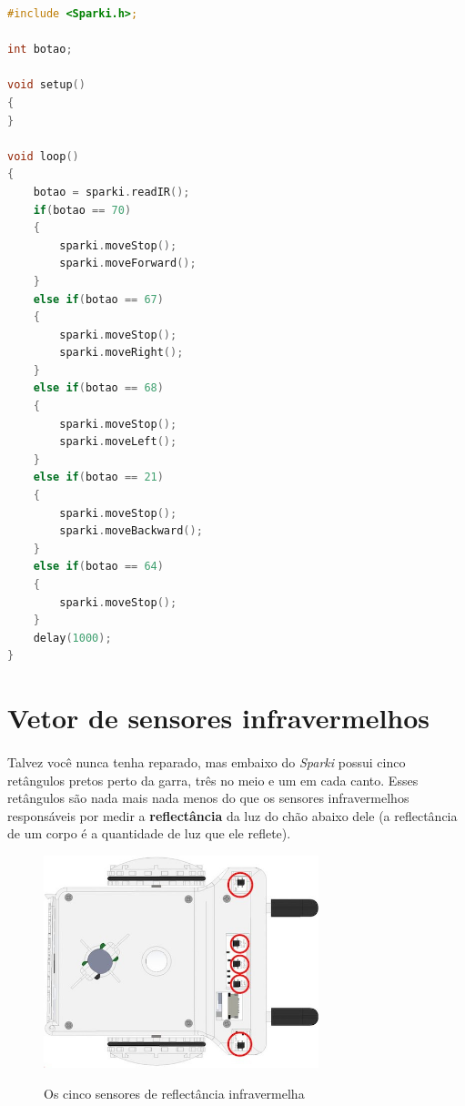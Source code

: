     \begin{lstlisting}[language=C]
#include <Sparki.h>;

int botao;

void setup()
{
}

void loop()
{
    botao = sparki.readIR();
    if(botao == 70)
    {
        sparki.moveStop();
        sparki.moveForward();
    }
    else if(botao == 67)
    {
        sparki.moveStop();
        sparki.moveRight();
    }
    else if(botao == 68)
    {
        sparki.moveStop();
        sparki.moveLeft();
    }
    else if(botao == 21)
    {
        sparki.moveStop();
        sparki.moveBackward();
    }
    else if(botao == 64)
    {
        sparki.moveStop();
    }
    delay(1000);
}
\end{lstlisting}

\section{Vetor de sensores infravermelhos}

\paragraph{}
Talvez você nunca tenha reparado, mas embaixo do \textit{Sparki} possui cinco retângulos pretos perto da garra, três no meio e um em cada canto. Esses retângulos são nada mais nada menos do que os sensores infravermelhos responsáveis por medir a \textbf{reflectância} da luz do chão abaixo dele (a reflectância de um corpo é a quantidade de luz que ele reflete).

    \begin{figure}[h]
    \caption{Os cinco sensores de reflectância infravermelha}
     
    \centering 
    \includegraphics[width=8cm]{Figuras/vetor.jpg}
    \label{figura:vetor.jpeg}
    \end{figure}

